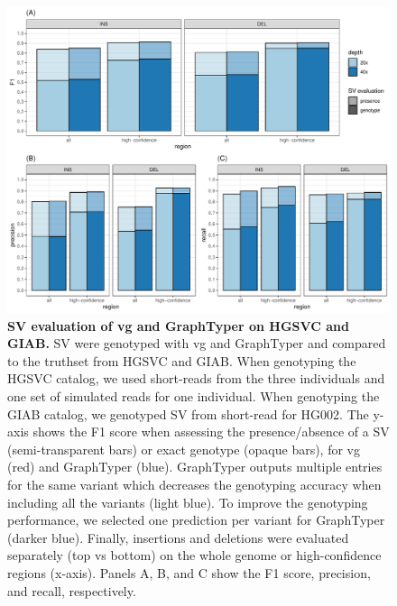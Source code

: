 \documentclass[11pt]{ucscthesis}
\begin{document}
\begin{figure}[p]
    \centering
    \includegraphics[width=.9\linewidth, page=2]{fig-sveval.pdf}
    \caption[SV evaluation of vg and GraphTyper on HGSVC and GIAB]{{\bf SV evaluation of vg and GraphTyper on HGSVC and GIAB.}
      SV were genotyped with vg and GraphTyper and compared to the truthset from HGSVC\cite{chaisson_sv_2019} and GIAB\cite{zook_robust_2020}.
      When genotyping the HGSVC catalog, we used short-reads from the three individuals and one set of simulated reads for one individual.
      When genotyping the GIAB catalog, we genotyped SV from short-read for HG002.
      The y-axis shows the F1 score when assessing the presence/absence of a SV (semi-transparent bars) or exact genotype (opaque bars), for vg (red) and GraphTyper (blue).
      GraphTyper outputs multiple entries for the same variant which decreases the genotyping accuracy when including all the variants (light blue).
      To improve the genotyping performance, we selected one prediction per variant for GraphTyper (darker blue).
      Finally, insertions and deletions were evaluated separately (top vs bottom) on the whole genome or high-confidence regions (x-axis).
      Panels A, B, and C show the F1 score, precision, and recall, respectively.
      }
    \label{fig:graphtyper_eval}
\end{figure}
\end{document}

